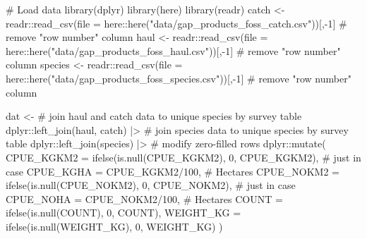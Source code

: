 \documentclass[
  letterpaper,
  oneside,
  open=any]{scrbook}
\newenvironment{Shaded}{\begin{snugshade}}{\end{snugshade}}
\newcommand{\AttributeTok}[1]{\textcolor[rgb]{0.40,0.45,0.13}{#1}}
\newcommand{\CommentTok}[1]{\textcolor[rgb]{0.37,0.37,0.37}{#1}}
\newcommand{\DecValTok}[1]{\textcolor[rgb]{0.68,0.00,0.00}{#1}}
\newcommand{\FunctionTok}[1]{\textcolor[rgb]{0.28,0.35,0.67}{#1}}
\newcommand{\NormalTok}[1]{\textcolor[rgb]{0.00,0.23,0.31}{#1}}
\newcommand{\OtherTok}[1]{\textcolor[rgb]{0.00,0.23,0.31}{#1}}
\newcommand{\SpecialCharTok}[1]{\textcolor[rgb]{0.37,0.37,0.37}{#1}}
\newcommand{\StringTok}[1]{\textcolor[rgb]{0.13,0.47,0.30}{#1}}
\begin{document}
\begin{Shaded}
\begin{Highlighting}[]
\CommentTok{\# Load data}
\FunctionTok{library}\NormalTok{(dplyr)}
\FunctionTok{library}\NormalTok{(here)}
\FunctionTok{library}\NormalTok{(readr)}
\NormalTok{catch }\OtherTok{\textless{}{-}}\NormalTok{ readr}\SpecialCharTok{::}\FunctionTok{read\_csv}\NormalTok{(}\AttributeTok{file =}\NormalTok{ here}\SpecialCharTok{::}\FunctionTok{here}\NormalTok{(}\StringTok{"data/gap\_products\_foss\_catch.csv"}\NormalTok{))[,}\SpecialCharTok{{-}}\DecValTok{1}\NormalTok{] }\CommentTok{\# remove "row number" column}
\NormalTok{haul }\OtherTok{\textless{}{-}}\NormalTok{ readr}\SpecialCharTok{::}\FunctionTok{read\_csv}\NormalTok{(}\AttributeTok{file =}\NormalTok{ here}\SpecialCharTok{::}\FunctionTok{here}\NormalTok{(}\StringTok{"data/gap\_products\_foss\_haul.csv"}\NormalTok{))[,}\SpecialCharTok{{-}}\DecValTok{1}\NormalTok{] }\CommentTok{\# remove "row number" column}
\NormalTok{species }\OtherTok{\textless{}{-}}\NormalTok{ readr}\SpecialCharTok{::}\FunctionTok{read\_csv}\NormalTok{(}\AttributeTok{file =}\NormalTok{ here}\SpecialCharTok{::}\FunctionTok{here}\NormalTok{(}\StringTok{"data/gap\_products\_foss\_species.csv"}\NormalTok{))[,}\SpecialCharTok{{-}}\DecValTok{1}\NormalTok{] }\CommentTok{\# remove "row number" column}

\NormalTok{dat }\OtherTok{\textless{}{-}} 
  \CommentTok{\# join haul and catch data to unique species by survey table}
\NormalTok{  dplyr}\SpecialCharTok{::}\FunctionTok{left\_join}\NormalTok{(haul, catch) }\SpecialCharTok{|\textgreater{}} 
  \CommentTok{\# join species data to unique species by survey table}
\NormalTok{  dplyr}\SpecialCharTok{::}\FunctionTok{left\_join}\NormalTok{(species) }\SpecialCharTok{|\textgreater{}} 
  \CommentTok{\# modify zero{-}filled rows}
\NormalTok{  dplyr}\SpecialCharTok{::}\FunctionTok{mutate}\NormalTok{(}
    \AttributeTok{CPUE\_KGKM2 =} \FunctionTok{ifelse}\NormalTok{(}\FunctionTok{is.null}\NormalTok{(CPUE\_KGKM2), }\DecValTok{0}\NormalTok{, CPUE\_KGKM2), }\CommentTok{\# just in case}
    \AttributeTok{CPUE\_KGHA =}\NormalTok{ CPUE\_KGKM2}\SpecialCharTok{/}\DecValTok{100}\NormalTok{, }\CommentTok{\# Hectares}
    \AttributeTok{CPUE\_NOKM2 =} \FunctionTok{ifelse}\NormalTok{(}\FunctionTok{is.null}\NormalTok{(CPUE\_NOKM2), }\DecValTok{0}\NormalTok{, CPUE\_NOKM2), }\CommentTok{\# just in case}
    \AttributeTok{CPUE\_NOHA =}\NormalTok{ CPUE\_NOKM2}\SpecialCharTok{/}\DecValTok{100}\NormalTok{, }\CommentTok{\# Hectares}
    \AttributeTok{COUNT =} \FunctionTok{ifelse}\NormalTok{(}\FunctionTok{is.null}\NormalTok{(COUNT), }\DecValTok{0}\NormalTok{, COUNT),}
    \AttributeTok{WEIGHT\_KG =} \FunctionTok{ifelse}\NormalTok{(}\FunctionTok{is.null}\NormalTok{(WEIGHT\_KG), }\DecValTok{0}\NormalTok{, WEIGHT\_KG) )}
\end{Highlighting}
\end{Shaded}
\end{document}
